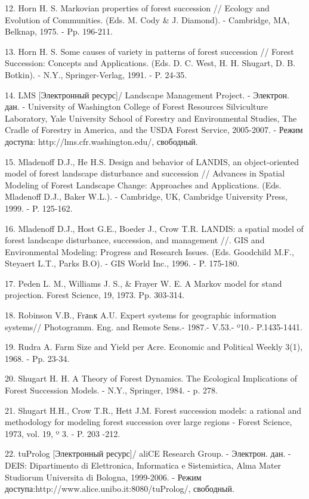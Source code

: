 \documentclass{article}
\begin{document}
12. Horn H. S. Markovian properties of forest succession // Ecology and Evolution 
of Communities. (Eds. M. Cody \& J. Diamond). - Cambridge, MA, Belknap, 1975. - 
Pp. 196-211. 

13. Horn H. S. Some causes of variety in patterns of forest succession // Forest 
Succession: Concepts and Applications. (Eds. D. C. West, H. H. Shugart, D. B. Botkin). 
-  N.Y., Springer-Verlag, 1991. - P. 24-35. 

14. LMS [Электронный ресурс]/ Landscape Management Project. - 
Электрон. дан. - University of Washington College of Forest Resources 
Silviculture Laboratory, Yale University School of Forestry and Environmental Studies, 
The Cradle of Forestry in America, and the USDA Forest Service, 2005-2007. - Режим 
доступа: http://lms.cfr.washington.edu/, свободный.

15. Mladenoff D.J., He H.S. Design and behavior of LANDIS, an object-oriented model 
of forest landscape disturbance and succession // Advances in Spatial Modeling 
of Forest Landscape Change: Approaches and Applications. (Eds. Mladenoff D.J., 
Baker W.L.). - Cambridge, UK, Cambridge University Press, 1999. - P. 125-162.

16. Mladenoff D.J., Host G.E., Boeder J., Crow T.R. LANDIS: a spatial model of 
forest landscape disturbance, succession, and management //. GIS and Environmental 
Modeling: Progress and Research Issues. (Eds. Goodchild M.F., Steyaert L.T., Parks 
B.O). - GIS World Inc., 1996. - P. 175-180.

17. Peden L. M., Williams J. S., \& Frayer W. E. A Markov model for stand projection. 
Forest Science, 19, 1973. Pp. 303-314.

18. Robinson V.B., Frаnк A.U. Expert systems for geographic information systems// 
Photogramm. Eng. and Remote Sens.- 1987.- V.53.- º10.- P.1435-1441.

19. Rudra A. Farm Size and Yield per Acre. Economic and Political Weekly 3(1), 
1968. - Pp. 23-34.

20. Shugart H. H. A Theory of Forest Dynamics. The Ecological Implications of Forest 
Succession Models. - N.Y., Springer, 1984. - p. 278.

21. Shugart H.H., Crow T.R., Hett J.M. Forest succession models: a rational and 
methodology for modeling forest succession over large regions - Forest Science, 
1973, vol. 19, º 3. - P. 203 -212.

22. tuProlog [Электронный ресурс]/ aliCE Research Group. - Электрон. 
дан. - DEIS:   Dipartimento di Elettronica, Informatica e Sistemistica, Alma 
Mater Studiorum Universita di Bologna, 1999-2006. - Режим доступа:http://www.alice.unibo.it:8080/tuProlog/, 
свободный.
\end{document}
